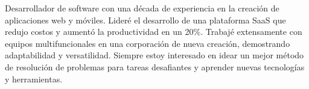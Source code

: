 
\begin{cvparagraph}

Desarrollador de software con una década de experiencia en la creación de aplicaciones web y móviles. Lideré el desarrollo de una plataforma SaaS que redujo costos y aumentó la productividad en un 20\%. Trabajé extensamente con equipos multifuncionales en una corporación de nueva creación, demostrando adaptabilidad y versatilidad. Siempre estoy interesado en idear un mejor método de resolución de problemas para tareas desafiantes y aprender nuevas tecnologías y herramientas.
\end{cvparagraph}
